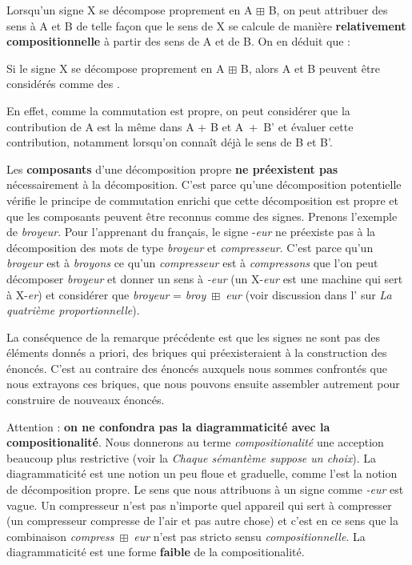Lorsqu’un signe X se décompose proprement en A ${\boxplus}$ B, on peut attribuer des sens à A et B de telle façon que le sens de X se calcule de manière \textbf{relativement compositionnelle} à partir des sens de A et de B. On en déduit que :

\begin{styleLivreImportant}
Si le signe X se décompose proprement en A ${\boxplus}$ B, alors A et B peuvent être considérés comme des .
\end{styleLivreImportant}

 En effet, comme la commutation est propre, on peut considérer que la contribution de A est la même dans A + B et A~+~B’ et évaluer cette contribution, notamment lorsqu’on connaît déjà le sens de B et B’.

Les \textbf{composants} d’une décomposition propre \textbf{ne préexistent pas} nécessairement à la décomposition. C’est parce qu’une décomposition potentielle vérifie le principe de commutation enrichi que cette décomposition est propre et que les composants peuvent être reconnus comme des signes. Prenons l’exemple de \textit{broyeur}. Pour l’apprenant du français, le signe -\textit{eur} ne préexiste pas à la décomposition des mots de type \textit{broyeur} et \textit{compresseur}. C’est parce qu’un \textit{broyeur} est à \textit{broyons} ce qu’un \textit{compresseur} est à \textit{compressons} que l’on peut décomposer \textit{broyeur} et donner un sens à \textit{{}-eur} (un X-\textit{eur} est une machine qui sert à X-\textit{er}) et considérer que \textit{broyeur} = \textit{broy}~${\boxplus}$~\textit{eur} (voir discussion dans l’ sur \textit{La quatrième proportionnelle}).

La conséquence de la remarque précédente est que les signes ne sont pas des éléments donnés a priori, des briques qui préexisteraient à la construction des énoncés. C’est au contraire des énoncés auxquels nous sommes confrontés que nous extrayons ces briques, que nous pouvons ensuite assembler autrement pour construire de nouveaux énoncés.

Attention : \textbf{on ne confondra pas la diagrammaticité avec la compositionalité}. Nous donnerons au terme \textit{compositionalité} une acception beaucoup plus restrictive (voir la  \textit{Chaque sémantème suppose un choix}). La diagrammaticité est une notion un peu floue et graduelle, comme l’est la notion de décomposition propre. Le sens que nous attribuons à un signe comme \textit{{}-eur} est vague. Un compresseur n’est pas n’importe quel appareil qui sert à compresser (un compresseur compresse de l’air et pas autre chose) et c’est en ce sens que la combinaison \textit{compress}~${\boxplus}$~\textit{eur} n’est pas stricto sensu \textit{compositionnelle}. La diagrammaticité est une forme \textbf{faible} de la compositionalité.

